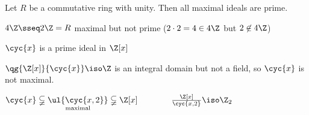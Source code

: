 \begin{corollary*}
  Let \( R \) be a commutative ring with unity. Then all maximal ideals are prime.
\end{corollary*}

\begin{example}
 \( 4\Z\sseq 2\Z = R \) maximal but not prime (\( 2\cdot 2 = 4 \in 4\Z \) but \( 2\not\in 4\Z \))
\end{example}

\begin{example}
  \( \cyc{x} \) is a prime ideal in \( \Z[x] \)

  \( \qg{\Z[x]}{\cyc{x}} \iso \Z \) is an integral domain but not a field, so \( \cyc{x} \) is not maximal.

  \( \cyc{x} \subsetneqq \underset{\text{maximal}}{\ul{\cyc{x,2}}} \subsetneqq \Z[x] \qquad\qquad \frac{\Z[x]}{\cyc{x,2}} \iso \Z_2 \)
\end{example}